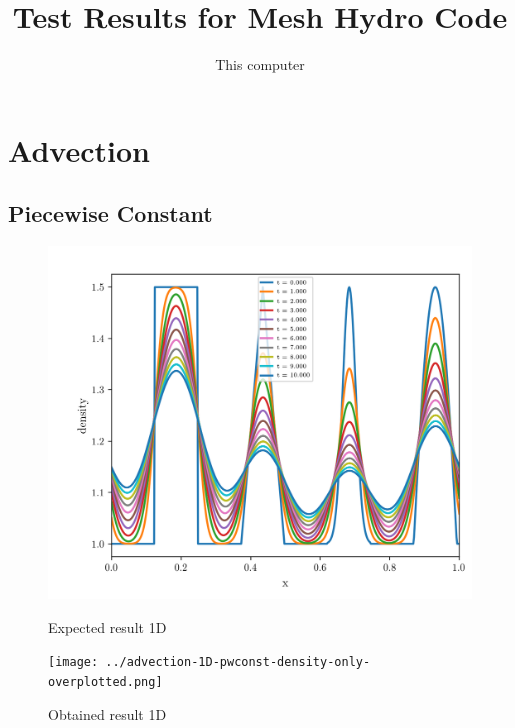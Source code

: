 




\title{Test Results for Mesh Hydro Code}
\author{This computer}
\date{}










	

\maketitle

\tableofcontents
\clearpage



\section{Advection}

\subsection{Piecewise Constant}

    \begin{figure}[htbp]
        \centering
        \includegraphics[width=.7\textwidth]{./figures/advection-1D-pwconst-density-only-overplotted.png}%
        \caption{Expected result 1D}
        \texttt{[image: ../advection-1D-pwconst-density-only-overplotted.png]}%
        \caption{Obtained result 1D}
    \end{figure}

